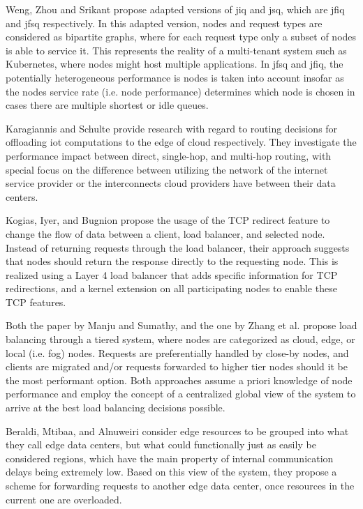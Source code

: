 \documentclass[draft,final]{vutinfth} %
\begin{document}
Weng, Zhou and Srikant propose adapted versions of \gls{jiq} and \gls{jsq}, which are \gls{jfiq} and \gls{jfsq} respectively.
In this adapted version, nodes and request types are considered as bipartite graphs, where for each request type only a subset of nodes is able to service it.
This represents the reality of a multi-tenant system such as Kubernetes\cite{kubernetes}, where nodes might host multiple applications.
In \gls{jfsq} and \gls{jfiq}, the potentially heterogeneous performance is nodes is taken into account insofar as the nodes service rate (i.e. node performance) determines which node is chosen in cases there are multiple shortest or idle queues.


Karagiannis and Schulte provide research with regard to routing decisions for offloading \gls{iot} computations to the edge of cloud respectively\cite{karagiannisEdgeRoutingUsingCompute2021}.
They investigate the performance impact between direct, single-hop, and multi-hop routing, with special focus on the difference between utilizing the network of the internet service provider or the interconnects cloud providers have between their data centers.

Kogias, Iyer, and Bugnion propose the usage of the TCP redirect feature to change the flow of data between a client, load balancer, and selected node\cite{kogiasBypassingLoadBalancer2020}.
Instead of returning requests through the load balancer, their approach suggests that nodes should return the response directly to the requesting node.
This is realized using a Layer 4 load balancer that adds specific information for TCP redirections, and a kernel extension on all participating nodes to enable these TCP features.

Both the paper by Manju and Sumathy\cite{manjuEfficientLoadBalancing2019}, and the one by Zhang et al. \cite{zhangSecureOptimizedLoad2021} propose load balancing through a tiered system, where nodes are categorized as cloud, edge, or local (i.e. fog) nodes.
Requests are preferentially handled by close-by nodes, and clients are migrated and/or requests forwarded to higher tier nodes should it be the most performant option.
Both approaches assume a priori knowledge of node performance and employ the concept of a centralized global view of the system to arrive at the best load balancing decisions possible.

Beraldi, Mtibaa, and Alnuweiri\cite{beraldiCooperativeLoadBalancing2017} consider edge resources to be grouped into what they call edge data centers, but what could functionally just as easily be considered regions, which have the main property of internal communication delays being extremely low.
Based on this view of the system, they propose a scheme for forwarding requests to another edge data center, once resources in the current one are overloaded.
\end{document}
